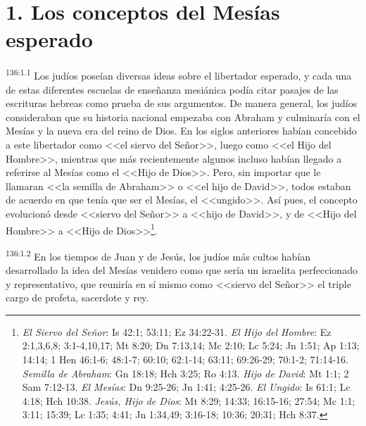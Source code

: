 \section*{1. Los conceptos del Mesías esperado}
\par 
\textsuperscript{136:1.1} Los judíos poseían diversas ideas sobre el libertador esperado, y cada una de estas diferentes escuelas de enseñanza mesiánica podía citar pasajes de las escrituras hebreas como prueba de sus argumentos. De manera general, los judíos consideraban que su historia nacional empezaba con Abraham y culminaría con el Mesías y la nueva era del reino de Dios. En los siglos anteriores habían concebido a este libertador como <<el siervo del Señor>>, luego como <<el Hijo del Hombre>>, mientras que más recientemente algunos incluso habían llegado a referirse al Mesías como el <<Hijo de Dios>>. Pero, sin importar que le llamaran <<la semilla de Abraham>> o <<el hijo de David>>, todos estaban de acuerdo en que tenía que ser el Mesías, el <<ungido>>. Así pues, el concepto evolucionó desde <<siervo del Señor>> a <<hijo de David>>, y de <<Hijo del Hombre>> a <<Hijo de Dios>>\footnote{\textit{El Siervo del Señor}: Is 42:1; 53:11; Ez 34:22-31. \textit{El Hijo del Hombre}: Ez 2:1,3,6,8; 3:1-4,10,17; Mt 8:20; Dn 7:13,14; Mc 2:10; Lc 5:24; Jn 1:51; Ap 1:13; 14:14; 1 Hen 46:1-6; 48:1-7; 60:10; 62:1-14; 63:11; 69:26-29; 70:1-2; 71:14-16. \textit{Semilla de Abraham}: Gn 18:18; Hch 3:25; Ro 4:13. \textit{Hijo de David}: Mt 1:1; 2 Sam 7:12-13. \textit{El Mesías}: Dn 9:25-26; Jn 1:41; 4:25-26. \textit{El Ungido}: Is 61:1; Lc 4:18; Hch 10:38. \textit{Jesús, Hijo de Dios}: Mt 8:29; 14:33; 16:15-16; 27:54; Mc 1:1; 3:11; 15:39; Lc 1:35; 4:41; Jn 1:34,49; 3:16-18; 10:36; 20:31; Hch 8:37.}.

\par 
\textsuperscript{136:1.2} En los tiempos de Juan y de Jesús, los judíos más cultos habían desarrollado la idea del Mesías venidero como que sería un israelita perfeccionado y representativo, que reuniría en sí mismo como <<siervo del Señor>> el triple cargo de profeta, sacerdote y rey.

